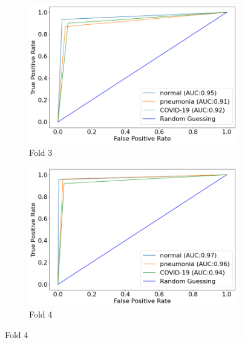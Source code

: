\begin{figure}
     \vspace{10mm} %
     \begin{subfigure}[b]{0.49\textwidth}
         \centering
         \includegraphics[width=\textwidth]{figures/au-roc-3.png}
         \caption{Fold 3}
         \label{fig:auroc-fold-3}
     \end{subfigure}
     \hfill
     \begin{subfigure}[b]{0.49\textwidth}
         \centering
         \includegraphics[width=\textwidth]{figures/au-roc-4.png}
         \caption{Fold 4}
         \label{fig:auroc-fold-4}
     \end{subfigure}
     

\end{figure}

